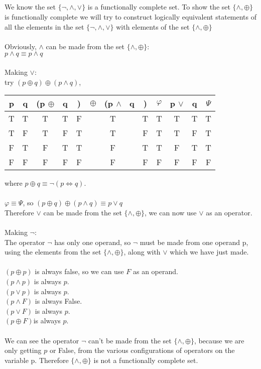 \documentclass[]{article}
\begin{document}
\subsection{}
We know the set $\{\neg , \wedge , \vee\}$ is a functionally complete set. To show the set $\{\wedge,\oplus\} $ is functionally complete we will try to construct logically equivalent statements of all the elements in the set $\{\neg , \wedge , \vee\}$ with elements of the set $\{\wedge,\oplus\} $
\\
\\
Obviously, $\wedge$ can be made from the set  $\{\wedge,\oplus\} $:
\\
$p \wedge q \equiv p \wedge q$
\\
\\
Making $\vee$:
\\
try $(p \oplus q) \oplus (p \wedge q)$,
\begin{center}
\begin{tabular}{|c|c|ccccccc|c|cc|c|}
	\hline 
	p & q & (p $ \oplus$ &q&)& $\oplus$ &(p $\wedge$ &q&)& $\varphi$ & p $\vee$ & q & $\Psi$ \\ 
	\hline 
	T & T & T & T & F& & T & & T & T & T & T & T \\ 
	\hline 
	T & F & T & F & T& & T & & F & T & T &  F & T \\ 
	\hline 
	F & T & F & T & T& & F & & T & T & F & T & T  \\ 
	\hline 
	F & F & F & F & F& & F & & F & F & F & F & F \\ 
	\hline 
\end{tabular} 
\end{center}
where $p\oplus q \equiv\neg (p\iff q)$.
\\
\\
$\varphi \equiv \Psi$, so $(p \oplus q) \oplus (p \wedge q) \equiv p \vee q$
\\
Therefore $\vee$ can be made from the set $\{\wedge,\oplus\} $, we can now use $\vee$ as an operator.
\\
\\
Making $\neg $:
\\
The operator $\neg$ has only one operand, so $\neg$ must be made from one operand p, using the elements from the set $\{\wedge,\oplus\}$, along with $\vee$ which we have just made.
\\
\\
$(p \oplus p)$ is always false, so we can use $F$ as an operand.
\\
$(p \wedge p)$ is always $p$.
\\
$(p \vee p)$ is always $p$.
\\
$(p \wedge F)$ is always False.
\\
$(p \vee F)$ is always $p$.
\\
$(p \oplus F) $is always $p$.
\\
\\
We can see the operator $\neg$ can't be made from the set $\{\wedge,\oplus\} $, because we are only getting $p$ or False, from the various configurations of operators on the variable p. Therefore $\{\wedge,\oplus\} $ is not a functionally complete set.
\end{document}
